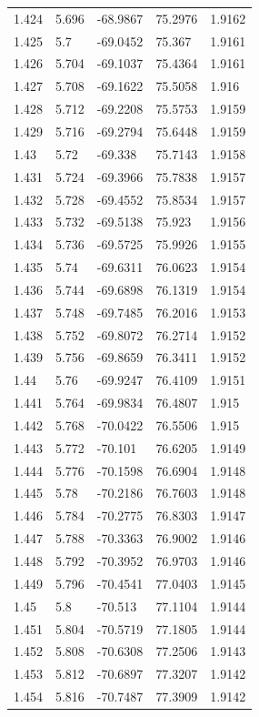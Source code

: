 \begin{tabular}{lllll}
1.424 & 5.696 & -68.9867 & 75.2976 & 1.9162 \\
1.425 & 5.7 & -69.0452 & 75.367 & 1.9161 \\
1.426 & 5.704 & -69.1037 & 75.4364 & 1.9161 \\
1.427 & 5.708 & -69.1622 & 75.5058 & 1.916 \\
1.428 & 5.712 & -69.2208 & 75.5753 & 1.9159 \\
1.429 & 5.716 & -69.2794 & 75.6448 & 1.9159 \\
1.43 & 5.72 & -69.338 & 75.7143 & 1.9158 \\
1.431 & 5.724 & -69.3966 & 75.7838 & 1.9157 \\
1.432 & 5.728 & -69.4552 & 75.8534 & 1.9157 \\
1.433 & 5.732 & -69.5138 & 75.923 & 1.9156 \\
1.434 & 5.736 & -69.5725 & 75.9926 & 1.9155 \\
1.435 & 5.74 & -69.6311 & 76.0623 & 1.9154 \\
1.436 & 5.744 & -69.6898 & 76.1319 & 1.9154 \\
1.437 & 5.748 & -69.7485 & 76.2016 & 1.9153 \\
1.438 & 5.752 & -69.8072 & 76.2714 & 1.9152 \\
1.439 & 5.756 & -69.8659 & 76.3411 & 1.9152 \\
1.44 & 5.76 & -69.9247 & 76.4109 & 1.9151 \\
1.441 & 5.764 & -69.9834 & 76.4807 & 1.915 \\
1.442 & 5.768 & -70.0422 & 76.5506 & 1.915 \\
1.443 & 5.772 & -70.101 & 76.6205 & 1.9149 \\
1.444 & 5.776 & -70.1598 & 76.6904 & 1.9148 \\
1.445 & 5.78 & -70.2186 & 76.7603 & 1.9148 \\
1.446 & 5.784 & -70.2775 & 76.8303 & 1.9147 \\
1.447 & 5.788 & -70.3363 & 76.9002 & 1.9146 \\
1.448 & 5.792 & -70.3952 & 76.9703 & 1.9146 \\
1.449 & 5.796 & -70.4541 & 77.0403 & 1.9145 \\
1.45 & 5.8 & -70.513 & 77.1104 & 1.9144 \\
1.451 & 5.804 & -70.5719 & 77.1805 & 1.9144 \\
1.452 & 5.808 & -70.6308 & 77.2506 & 1.9143 \\
1.453 & 5.812 & -70.6897 & 77.3207 & 1.9142 \\
1.454 & 5.816 & -70.7487 & 77.3909 & 1.9142 \\

\end{tabular}
